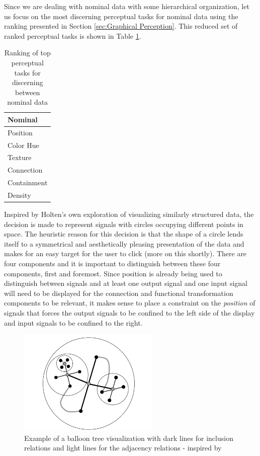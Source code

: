 Since we are dealing with nominal data with some hierarchical organization, let us focus on the most discerning perceptual tasks for nominal data using the ranking presented in Section \ref{sec:Graphical Perception}. This reduced set of ranked perceptual tasks is shown in Table \ref{tab:perceptualNominal}.

\begin{table}
    \begin{center}
    \begin{tabular}{ | l | }
    \hline
    Nominal \\ \hline
    Position \\
    Color Hue \\
    Texture \\
    Connection \\
    Containment \\
    Density \\
    \hline
    \end{tabular}
    \end{center}
    \caption{Ranking of top perceptual tasks for discerning between nominal data \cite{jock1986}}
    \label{tab:perceptualNominal}
\end{table}

Inspired by Holten's own exploration of visualizing similarly structured data, the decision is made to represent signals with circles occupying different points in space. The heuristic reason for this decision is that the shape of a circle lends itself to a symmetrical and aesthetically pleasing presentation of the data and makes for an easy target for the user to click (more on this shortly). There are four components and it is important to distinguish between these four components, first and foremost. Since position is already being used to distinguish between signals and at least one output signal and one input signal will need to be displayed for the connection and functional transformation components to be relevant, it makes sense to place a constraint on the \emph{position} of signals that forces the output signals to be confined to the left side of the display and input signals to be confined to the right.

\begin{figure}[htb]
\centering
\includegraphics[width=0.6\textwidth]{holten_balloon.png}
\caption{Example of a balloon tree visualization with dark lines for inclusion relations and light lines for the adjacency relations - inspired by \cite{edgebundles2006}}
\label{fig:balloonTree}
\end{figure}

